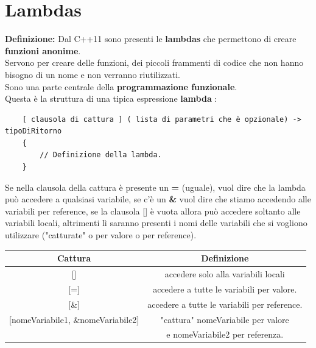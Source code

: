 



\section{Lambdas}

\textsf{\small \textbf{Definizione:} Dal C++11 sono presenti le \textbf{lambdas} che permettono di creare \textbf{funzioni anonime}.} \\

\textsf{\small Servono per creare delle funzioni, dei piccoli frammenti di codice che non hanno bisogno di un nome e non verranno riutilizzati. } \\ %

\textsf{\small Sono una parte centrale della \textbf{programmazione funzionale}.} \\

\textsf{\small Questa è la struttura di una tipica espressione \textbf{lambda} :} \\

\begin{lstlisting}
	[ clausola di cattura ] ( lista di parametri che è opzionale) -> tipoDiRitorno
	{
		// Definizione della lambda.
	}
\end{lstlisting}

\textsf{\small Se nella clausola della cattura è presente un \textbf{=} (uguale), vuol dire che la lambda può accedere a qualsiasi variabile, se c'è un \textbf{\&} vuol dire che stiamo accedendo alle variabili per reference, se la clausola [] è vuota allora può accedere soltanto alle variabili locali, altrimenti lì saranno presenti i nomi delle variabili che si vogliono utilizzare ("catturate" o per valore o per reference).} \\ %

\begin{tabular}{|c|c|}
	\hline
	\textbf{Cattura} & \textbf{Definizione} \\
	\hline
	\textsf{\small []} & \textsf{\small accedere solo alla variabili locali} \\
	\hline
	\textsf{\small [=]} & \textsf{\small accedere a tutte le variabili per valore.} \\
	\hline
	\textsf{\small [\&]} & \textsf{\small accedere a tutte le variabili per reference.} \\
	\hline
	\textsf{\small [nomeVariabile1, \&nomeVariabile2]} & \textsf{\small "cattura" nomeVariabile per valore } \\
	\textsf{\small } & \textsf{\small e nomeVariabile2 per referenza.} \\
	\hline
\end{tabular} \\

